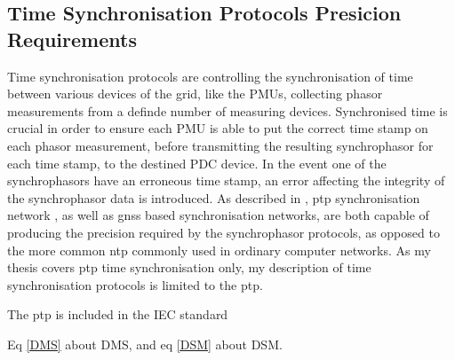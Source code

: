 \subsection{Time Synchronisation Protocols Presicion Requirements}
Time synchronisation protocols are controlling the synchronisation of time between various devices of the grid, like the PMUs, collecting phasor measurements from a definde number of measuring devices. Synchronised time is crucial in order to ensure each PMU is able to put the correct time stamp on each phasor measurement, before transmitting the resulting synchrophasor for each time stamp, to the destined PDC device. In the event one of the synchrophasors have an erroneous time stamp, an error affecting the integrity of the synchrophasor data is introduced. As described in \cite{moussa2016security}, \acrlong{ptp} synchronisation network
, as well as \acrlong{gnss} based synchronisation networks, are both capable of producing the precision required by the synchrophasor protocols, as opposed to the more common \acrfull{ntp} commonly used in ordinary computer networks. As my thesis covers \acrshort{ptp} time synchronisation only, my description of time synchronisation protocols is limited to the \acrfull{ptp}.



The \acrshort{ptp} is included in the IEC standard

Eq \ref{DMS} about DMS, and  eq \ref{DSM} about DSM.






















